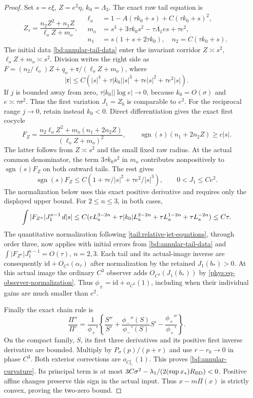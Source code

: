 \begin{proof}
Set \(s=e\xi\), \(Z=e^2\eta\), \(k_0=\Lambda_3\).
The exact raw tail equation is
\[
 Z_s=\frac{n_2Z^2+n_1Z}{\ell_oZ+m_o},\quad
 \begin{aligned}
 \ell_o&=1-A(\tau k_0+s)+C(\tau k_0+s)^2,\\
 m_o&=s^3+3\tau k_0s^2-\tau\Lambda_1es+\tau e^2,\\
 n_1&=s(1+s+2\tau k_0),\quad n_2=C(\tau k_0+s).
 \end{aligned}
\]
The initial data \eqref{bd:annular-tail-data} enter the invariant
corridor \(Z\asymp s^2\), \(\ell_oZ+m_o\asymp s^2\).
Division writes the right side as
\(F=(n_2/\ell_o)Z+q_o+\mathfrak r/(\ell_oZ+m_o)\), where
\[
 |\mathfrak r|\le C(|s|^4+\tau|k_0||s|^3
                       +\tau e|s|^2+\tau e^2|s|).
\]
If \(j\) is bounded away from zero,
\(\tau|k_0||\log e|\to0\), because
\(k_0=O(\sigma)\) and \(e\asymp\tau\sigma^2\).
Thus the first variation \(J_1=Z_b\) is comparable to \(e^2\).
For the reciprocal range \(j\to0\), retain instead \(k_0<0\).
Direct differentiation gives the exact first cocycle
\[
 F_Z=\frac{n_2\ell_oZ^2+m_o(n_1+2n_2Z)}{(\ell_oZ+m_o)^2},
 \qquad \operatorname{sgn}(s)(n_1+2n_2Z)\ge c|s| .
\]
The latter follows from \(Z\asymp s^2\) and the small fixed raw
radius. At the actual common denominator,
the term \(3\tau k_0s^2\) in \(m_o\) contributes nonpositively
to \(\operatorname{sgn}(s)F_Z\) on both outward tails.  The rest gives
\[
 \operatorname{sgn}(s)F_Z\le
 C(1+\tau e/|s|^2+\tau e^2/|s|^3),\qquad 0<J_1\le Ce^2.
\]
The normalization below uses this exact positive derivative and requires
only the displayed upper bound. For \(2\le n\le3\), in both cases,
\[
 \int |F_{Z^n}|J_1^{n-1}\,d|s|
 \le C(eL_{\rm a}^{3-2n}+\tau|k_0|L_{\rm a}^{2-2n}
                       +\tau L_{\rm a}^{1-2n}+\tau L_{\rm a}^{-2n})\le C\tau.
\]
The quantitative normalization following
\eqref{tail:relative-jet-equations}, through order three, now applies
with initial errors from \eqref{bd:annular-tail-data} and
\(\int|F_{Z^n}|J_1^{n-1}=O(\tau)\), \(n=2,3\).
Each tail and its actual-image inverse are consequently
\(\mathrm{id}+O_{C^3}(\alpha_\tau)\) after normalization by
the retained \(J_1(b_*)>0\). At this actual image the ordinary
\(C^3\) observer adds \(O_{C^3}(J_1(b_*))\) by
\eqref{phys:eq-observer-normalization}. Thus
\(\phi_\pm=\mathrm{id}+o_{C^3}(1)\), including when their
individual gains are much smaller than \(e^2\).

Finally the exact chain rule is
\[
 \frac{\Pi''}{\Pi'}=\frac1{\phi_+'}
 \left\{\frac{S''}{S'}+
       \frac{\phi_-''(S)}{\phi_-'(S)}S'
       -\frac{\phi_+''}{\phi_+'}\right\}.
\]
On the compact family, \(S\), its first three derivatives and
its positive first inverse derivative are bounded. Multiply by
\(P_\sigma(p)/(p+r)\) and use \(r-r_0\to0\) in phase
\(C^3\). Both exterior corrections are \(o_{C^1_{b_+}}(1)\).
This proves \eqref{bd:annular-curvature}.  Its principal term is at most
\(3C\sigma^2-\lambda_1/(2(\sup x_*)R_{\rm BD})<0\).
Positive affine changes preserve this sign in the actual input.
Thus \(x-m\Pi(x)\) is strictly convex, proving the two-zero bound.
\end{proof}


